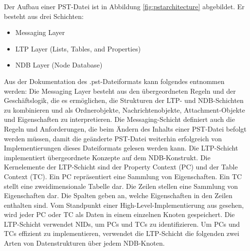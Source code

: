 Der Aufbau einer PST-Datei ist in Abbildung \ref{fig:pstarchitecture} abgebildet. Er besteht aus drei Schichten:

\begin{itemize}
    \item Messaging Layer
    \item LTP Layer (Lists, Tables, and Properties)
    \item NDB Layer (Node Database)

\end{itemize}

Aus der Dokumentation des .pst-Dateiformats kann folgendes entnommen werden: \newline
Die Messaging Layer besteht aus den übergeordneten Regeln und der Geschäftslogik, die es ermöglichen, die Strukturen der LTP- und NDB-Schichten zu kombinieren und als Ordnerobjekte, Nachrichtenobjekte, Attachment-Objekte und Eigenschaften zu interpretieren. Die Messaging-Schicht definiert auch die Regeln und Anforderungen, die beim Ändern des Inhalts einer PST-Datei befolgt werden müssen, damit die geänderte PST-Datei weiterhin erfolgreich von Implementierungen dieses Dateiformats gelesen werden kann. \newline
Die LTP-Schicht implementiert übergeordnete Konzepte auf dem NDB-Konstrukt. Die Kernelemente der LTP-Schicht sind der Property Context (PC) und der Table Context (TC). Ein PC repräsentiert eine Sammlung von Eigenschaften. Ein TC stellt eine zweidimensionale Tabelle dar. Die Zeilen stellen eine Sammlung von Eigenschaften dar. Die Spalten geben an, welche Eigenschaften in den Zeilen enthalten sind.
Vom Standpunkt einer High-Level-Implementierung aus gesehen, wird jeder PC oder TC als Daten in einem einzelnen Knoten gespeichert. Die LTP-Schicht verwendet NIDs, um PCs und TCs zu identifizieren.\newline
Um PCs und TCs effizient zu implementieren, verwendet die LTP-Schicht die folgenden zwei Arten von Datenstrukturen über jedem NDB-Knoten.
